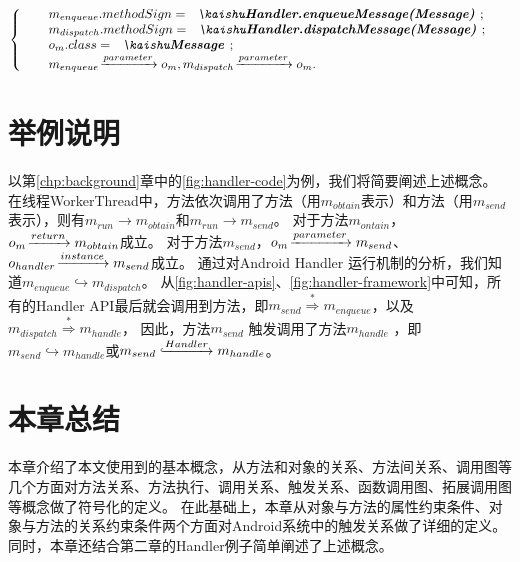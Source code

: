 { 
	\equwuhao
\begin{equation}
\left\{  
\begin{array}{ll}
&m_{enqueue}.methodSign = \text{\codeInEqu{Handler.enqueueMessage(Message)}};\\
&m_{dispatch}.methodSign = \text{\codeInEqu{Handler.dispatchMessage(Message)}};\\
& o_m.class =   \text{\codeInEqu{Message}}; \\
 &m_{enqueue}\joinrel\xrightarrow{parameter} o_m  , m_{dispatch}\joinrel\xrightarrow{parameter} o_m.
\end{array}  
\right.  
\label{equ:rule_handler} 
\end{equation}
}

\section{举例说明}



以第\ref{chp:background}章中的\autoref{fig:handler-code}为例，我们将简要阐述上述概念。
在线程WorkerThread中，方法依次调用了方法（用$m_{obtain}$表示）和方法（用$m_{send}$表示），则有$m_{run} \to m_{obtain} $和$m_{run} \to m_{send}$。
对于方法$m_{ontain}$，$o_{m} \joinrel\xrightarrow{return} m_{obtain} $成立。
对于方法$m_{send}$，$o_{m} \joinrel\xrightarrow{parameter} m_{send} $、$o_{handler} \joinrel\xrightarrow{instance} m_{send} $成立。
通过对Android Handler 运行机制的分析，我们知道$m_{enqueue} \hookrightarrow m_{dispatch}$。
从\autoref{fig:handler-apis}、\autoref{fig:handler-framework}中可知，所有的Handler API最后就会调用到方法，即$m_{send} \stackrel{\ast	}{\Rightarrow} m_{enqueue} $，以及$m_{dispatch} \stackrel{\ast}{\Rightarrow}  m_{handle}$，
因此，方法$m_{send}$ 触发调用了方法$m_{handle}$ ，即$m_{send} \hookrightarrow m_{handle}$或$m_{send} \lhook\joinrel\xrightarrow{Handler}  m_{handle} $。

\section{本章总结}

本章介绍了本文使用到的基本概念，从方法和对象的关系、方法间关系、调用图等几个方面对方法关系、方法执行、调用关系、触发关系、函数调用图、拓展调用图等概念做了符号化的定义。
在此基础上，本章从对象与方法的属性约束条件、对象与方法的关系约束条件两个方面对Android系统中的触发关系做了详细的定义。
同时，本章还结合第二章的Handler例子简单阐述了上述概念。
